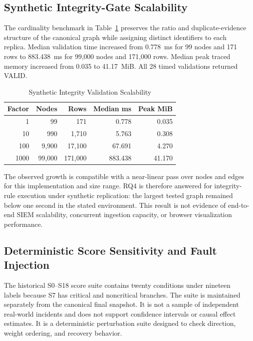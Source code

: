 \documentclass[a4paper,conference]{IEEEtran}
\begin{document}
\subsection{Synthetic Integrity-Gate Scalability}
The cardinality benchmark in Table~\ref{tab:scalability} preserves the ratio and duplicate-evidence structure of the canonical graph while assigning distinct identifiers to each replica. Median validation time increased from 0.778~ms for 99 nodes and 171 rows to 883.438~ms for 99,000 nodes and 171,000 rows. Median peak traced memory increased from 0.035 to 41.17~MiB. All 28 timed validations returned VALID.

\begin{table}[!t]
\caption{Synthetic Integrity Validation Scalability}
\label{tab:scalability}
\centering
\scriptsize
\begin{tabular}{rrrrr}
\toprule
\textbf{Factor} & \textbf{Nodes} & \textbf{Rows} & \textbf{Median ms} & \textbf{Peak MiB} \\
\midrule
1 & 99 & 171 & 0.778 & 0.035 \\
10 & 990 & 1,710 & 5.763 & 0.308 \\
100 & 9,900 & 17,100 & 67.691 & 4.270 \\
1000 & 99,000 & 171,000 & 883.438 & 41.170 \\
\bottomrule
\end{tabular}
\end{table}

The observed growth is compatible with a near-linear pass over nodes and edges for this implementation and size range. RQ4 is therefore answered for integrity-rule execution under synthetic replication: the largest tested graph remained below one second in the stated environment. This result is not evidence of end-to-end SIEM scalability, concurrent ingestion capacity, or browser visualization performance.

\subsection{Deterministic Score Sensitivity and Fault Injection}
The historical S0--S18 score suite contains twenty conditions under nineteen labels because S7 has critical and noncritical branches. The suite is maintained separately from the canonical final snapshot. It is not a sample of independent real-world incidents and does not support confidence intervals or causal effect estimates. It is a deterministic perturbation suite designed to check direction, weight ordering, and recovery behavior.
\end{document}
